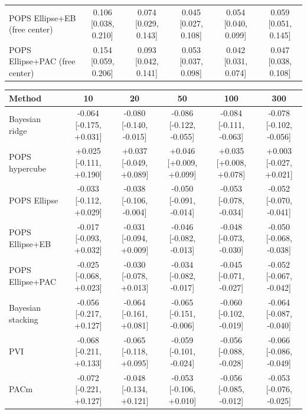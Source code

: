 \begin{tabular}{lccccc}
POPS Ellipse+EB (free center) & 0.106 {\scriptsize[0.038, 0.210]} & 0.074 {\scriptsize[0.029, 0.143]} & 0.045 {\scriptsize[0.027, 0.108]} & 0.054 {\scriptsize[0.040, 0.099]} & 0.059 {\scriptsize[0.051, 0.145]} \\
POPS Ellipse+PAC (free center) & 0.154 {\scriptsize[0.059, 0.206]} & 0.093 {\scriptsize[0.042, 0.141]} & 0.053 {\scriptsize[0.037, 0.098]} & 0.042 {\scriptsize[0.031, 0.074]} & 0.047 {\scriptsize[0.038, 0.108]} \\
\bottomrule
\end{tabular}

\begin{tabular}{lccccc}
\toprule
Method & 10 & 20 & 50 & 100 & 300 \\
\midrule
Bayesian ridge & -0.064 {\scriptsize[-0.175, +0.031]} & -0.080 {\scriptsize[-0.140, -0.015]} & -0.086 {\scriptsize[-0.122, -0.055]} & -0.084 {\scriptsize[-0.111, -0.063]} & -0.078 {\scriptsize[-0.102, -0.056]} \\
POPS hypercube & +0.025 {\scriptsize[-0.111, +0.190]} & +0.037 {\scriptsize[-0.049, +0.089]} & +0.046 {\scriptsize[+0.009, +0.099]} & +0.035 {\scriptsize[+0.008, +0.078]} & +0.003 {\scriptsize[-0.027, +0.021]} \\
POPS Ellipse & -0.033 {\scriptsize[-0.112, +0.029]} & -0.038 {\scriptsize[-0.106, -0.004]} & -0.050 {\scriptsize[-0.091, -0.014]} & -0.053 {\scriptsize[-0.078, -0.034]} & -0.052 {\scriptsize[-0.070, -0.041]} \\
POPS Ellipse+EB & -0.017 {\scriptsize[-0.093, +0.032]} & -0.031 {\scriptsize[-0.094, +0.009]} & -0.046 {\scriptsize[-0.082, -0.013]} & -0.048 {\scriptsize[-0.073, -0.030]} & -0.050 {\scriptsize[-0.068, -0.038]} \\
POPS Ellipse+PAC & -0.025 {\scriptsize[-0.068, +0.023]} & -0.030 {\scriptsize[-0.078, +0.013]} & -0.034 {\scriptsize[-0.082, -0.017]} & -0.045 {\scriptsize[-0.071, -0.027]} & -0.052 {\scriptsize[-0.067, -0.042]} \\
Bayesian stacking & -0.056 {\scriptsize[-0.217, +0.127]} & -0.064 {\scriptsize[-0.161, +0.081]} & -0.065 {\scriptsize[-0.151, -0.006]} & -0.060 {\scriptsize[-0.102, -0.019]} & -0.064 {\scriptsize[-0.087, -0.040]} \\
PVI & -0.068 {\scriptsize[-0.211, +0.133]} & -0.065 {\scriptsize[-0.118, +0.095]} & -0.059 {\scriptsize[-0.101, -0.024]} & -0.056 {\scriptsize[-0.088, -0.028]} & -0.066 {\scriptsize[-0.086, -0.049]} \\
PACm & -0.072 {\scriptsize[-0.221, +0.127]} & -0.048 {\scriptsize[-0.134, +0.121]} & -0.053 {\scriptsize[-0.106, +0.010]} & -0.056 {\scriptsize[-0.085, -0.012]} & -0.053 {\scriptsize[-0.076, -0.025]} \\

\end{tabular}
